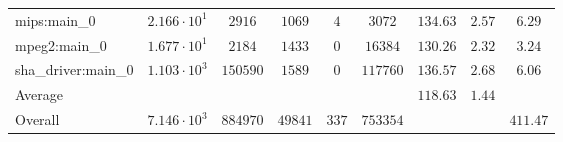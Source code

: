 \begin{tabular}{|l|c|c|c|c|c|c|c|c|}
mips:main\_0            & $ 2.166 \cdot 10^{1} $ & $ 2916   $ & $ 1069  $ & $ 4   $ & $ 3072   $ & $ 134.63      $ & $ 2.57    $ & $ 6.29    $ \\
mpeg2:main\_0           & $ 1.677 \cdot 10^{1} $ & $ 2184   $ & $ 1433  $ & $ 0   $ & $ 16384  $ & $ 130.26      $ & $ 2.32    $ & $ 3.24    $ \\
sha\_driver:main\_0     & $ 1.103 \cdot 10^{3} $ & $ 150590 $ & $ 1589  $ & $ 0   $ & $ 117760 $ & $ 136.57      $ & $ 2.68    $ & $ 6.06    $ \\
\hline
Average                 & $                    $ & $        $ & $       $ & $     $ & $        $ & $ 118.63      $ & $ 1.44    $ & $         $ \\
\hline
Overall                 & $ 7.146 \cdot 10^{3} $ & $ 884970 $ & $ 49841 $ & $ 337 $ & $ 753354 $ & $             $ & $         $ & $ 411.47  $ \\
\hline
\end{tabular}

